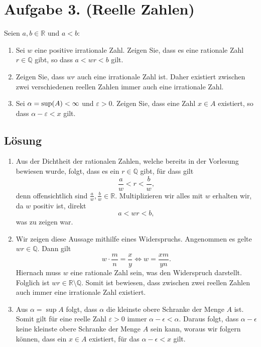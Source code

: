 \documentclass[german,12pt]{homework}
\newcommand{\QQ}{\mathbb{Q}}
\newcommand{\RR}{\mathbb{R}}
\DeclarePairedDelimiter{\enbrace}{(}{)}
\begin{document}
    \section*{Aufgabe 3. (Reelle Zahlen)}

    \begin{problem}
        Seien \(a, b \in \RR\) und \(a < b\):
        \begin{enumerate}
            \item Sei \(w\) eine positive irrationale Zahl. Zeigen Sie, dass es
            eine rationale Zahl \(r \in \QQ\) gibt, so dass \(a < wr < b\) gilt.
            \item Zeigen Sie, dass \(wr\) auch eine irrationale Zahl ist. Daher
            existiert zwischen zwei verschiedenen reellen Zahlen immer auch
            eine irrationale Zahl.
            \item Sei \(\alpha = \sup\enbrace*{A} < \infty\) und \(\varepsilon
            > 0\). Zeigen Sie, dass eine Zahl \(x \in A\) existiert, so dass
            \(\alpha - \varepsilon < x\) gilt.
        \end{enumerate}
    \end{problem}

    \subsection*{Lösung}
    \begin{enumerate}
        \item Aus der Dichtheit der rationalen Zahlen, welche bereits in der
        Vorlesung bewiesen wurde, folgt, dass es ein \(r \in \QQ\) gibt, für
        dass gilt
        \[\frac{a}{w} < r < \frac{b}{w},\]
        denn offensichtlich sind \(\frac{a}{w}, \frac{b}{w} \in \RR\).
        Multiplizieren wir alles mit \(w\) erhalten wir, da \(w\) positiv ist,
        direkt
        \[a < wr < b,\] was zu zeigen war.
        \item Wir zeigen diese Aussage mithilfe eines Widerspruchs. Angenommen
        es gelte \(wr \in \QQ\). Dann gilt
        \[w \cdot \frac{m}{n} = \frac{x}{y} \iff w = \frac{xm}{yn}.\]
        Hiernach muss \(w\) eine rationale Zahl sein, was den Widerspruch
        darstellt. Folglich ist \(wr \in \RR \setminus \QQ\). Somit ist
        bewiesen, dass zwischen zwei reellen Zahlen auch immer eine irrationale
        Zahl existiert.
        \item Aus \(\alpha = \sup{A}\) folgt, dass \(\alpha\) die kleinste
        obere Schranke der Menge \(A\) ist. Somit gilt für eine reelle Zahl
        \(\varepsilon > 0\) immer \(\alpha - \epsilon < \alpha\). Daraus folgt,
        dass \( \alpha - \epsilon\) keine kleinste obere Schranke der Menge
        \(A\) sein kann, woraus wir folgern können, dass ein \(x \in A\)
        existiert, für das \(\alpha - \epsilon < x\) gilt.
    \end{enumerate}
\end{document}
